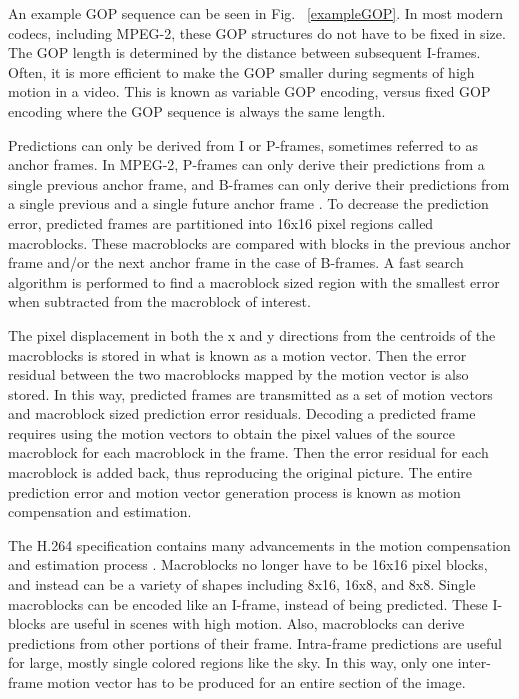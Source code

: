 An example GOP sequence can be seen in Fig. ~\ref{exampleGOP}. In most modern codecs, including MPEG-2, these GOP structures do not have to be fixed in size. The GOP length is determined by the distance between subsequent I-frames. Often, it is more efficient to make the GOP smaller during segments of high motion in a video. This is known as variable GOP encoding, versus fixed GOP encoding where the GOP sequence is always the same length.

Predictions can only be derived from I or P-frames, sometimes referred to as anchor frames. In MPEG-2, P-frames can only derive their predictions from a single previous anchor frame, and B-frames can only derive their predictions from a single previous and a single future anchor frame \cite{mpeg2}. To decrease the prediction error, predicted frames are partitioned into 16x16 pixel regions called macroblocks. These macroblocks are compared with blocks in the previous anchor frame and/or the next anchor frame in the case of B-frames. A fast search algorithm is performed to find a macroblock sized region with the smallest error when subtracted from the macroblock of interest.

The pixel displacement in both the x and y directions from the centroids of the macroblocks is stored in what is known as a motion vector. Then the error residual between the two macroblocks mapped by the motion vector is also stored. In this way, predicted frames are transmitted as a set of motion vectors and macroblock sized prediction error residuals. Decoding a predicted frame requires using the motion vectors to obtain the pixel values of the source macroblock for each macroblock in the frame. Then the error residual for each macroblock is added back, thus reproducing the original picture. The entire prediction error and motion vector generation process is known as motion compensation and estimation.

The H.264 specification contains many advancements in the motion compensation and estimation process \cite{h264} \cite{h264Overview}. Macroblocks no longer have to be 16x16 pixel blocks, and instead can be a variety of shapes including 8x16, 16x8, and 8x8. Single macroblocks can be encoded like an I-frame, instead of being predicted. These I-blocks are useful in scenes with high motion. Also, macroblocks can derive predictions from other portions of their frame. Intra-frame predictions are useful for large, mostly single colored regions like the sky. In this way, only one inter-frame motion vector has to be produced for an entire section of the image. 


